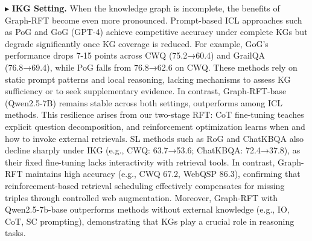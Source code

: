 \documentclass[sigconf]{acmart}
\begin{document}
 \noindent $\blacktriangleright$   \textbf{IKG Setting.} 
When the knowledge graph is incomplete, the benefits of Graph-RFT become even more pronounced. 
Prompt-based ICL approaches such as PoG and GoG (GPT-4) achieve competitive accuracy under complete KGs but degrade significantly once KG coverage is reduced. For example, GoG’s performance drops 7-15 points across CWQ (75.2→60.4) and GrailQA (76.8→69.4), while PoG falls from 76.8→62.6 on CWQ. These methods rely on static prompt patterns and local reasoning, lacking mechanisms to assess KG sufficiency or to seek supplementary evidence.
In contrast, Graph-RFT-base (Qwen2.5-7B) remains stable across both settings, outperforms among ICL methods. This resilience arises from our two-stage RFT: CoT fine-tuning teaches explicit question decomposition, and reinforcement optimization learns when and how to invoke external retrievals.
SL methods such as RoG and ChatKBQA also decline sharply under IKG (e.g., CWQ: 63.7→53.6; ChatKBQA: 72.4→37.8), as their fixed fine-tuning lacks interactivity with retrieval tools. In contrast, Graph-RFT maintains high accuracy (e.g., CWQ 67.2, WebQSP 86.3), confirming that reinforcement-based retrieval scheduling effectively compensates for missing triples through controlled web augmentation.
Moreover, Graph-RFT with Qwen2.5-7b-base outperforms methods without external knowledge (e.g., IO, CoT, SC prompting), demonstrating that KGs play a crucial role in reasoning tasks.
\end{document}

